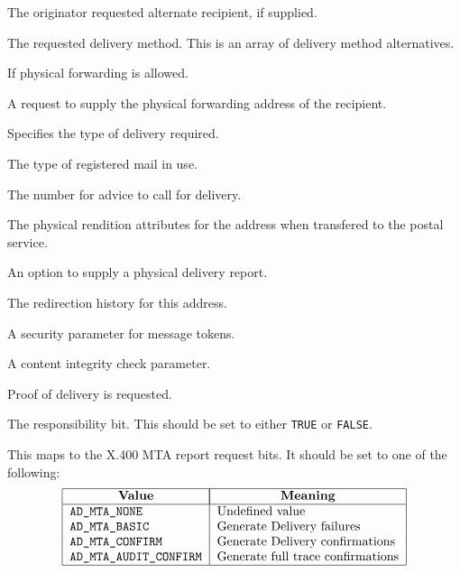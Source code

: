 \begin{describe}
\item[\verb|ad\_orig\_req\_alt|:]	The originator requested alternate
recipient, if supplied.

\item[\verb|ad\_req\_del|:]	The requested delivery method. This is
an array of delivery method alternatives.

\item[\verb|ad\_phys\_forward|:] If physical forwarding is allowed.

\item[\verb|ad\_phys\_fw\_ad\_req|:]	A request to supply the
physical forwarding address of the recipient.

\item[\verb|ad\_phys\_modes|:] Specifies the type of delivery required.

\item[\verb|ad\_reg\_mail\_type|:]	The type of registered mail in
use.

\item[\verb|ad\_recip\_number\_for\_advice|:]	The number for advice
to call for delivery.

\item[\verb|ad\_phys\_rendition\_attribute|:]	The physical rendition
attributes for the \linebreak[3] address when transfered to the postal service.

\item[\verb|ad\_pd\_report\_request|:] An option to supply a physical
delivery report.

\item[\verb|ad\_redirection\_history|:]	The redirection history for
this address.

\item[\verb|ad\_message\_token|:] A security parameter for message tokens.

\item[\verb|ad\_content\_integrity|:]	A content integrity check parameter.

\item[\verb|ad\_proof\_delvery|:]	Proof of delivery is requested.

\item[\verb|ad\_resp |:]	The responsibility bit. This should be
set to either \verb|TRUE| or \verb|FALSE|.

\item[\verb|ad\_mtareq|:]	This maps to the X.400 MTA 
report request bits. It should be set to one of the following:
\[\begin{tabular}{|l|l|}
\hline
	\multicolumn{1}{|c|}{\bf Value}&
		\multicolumn{1}{|c|}{\bf Meaning}\\
\hline
	\tt AD\_MTA\_NONE&	Undefined value\\
	\tt AD\_MTA\_BASIC& 	Generate Delivery failures\\
	\tt AD\_MTA\_CONFIRM&	Generate Delivery confirmations\\
	\tt AD\_MTA\_AUDIT\_CONFIRM&	Generate full trace confirmations\\
\hline
\end{tabular}\]


\end{describe}
